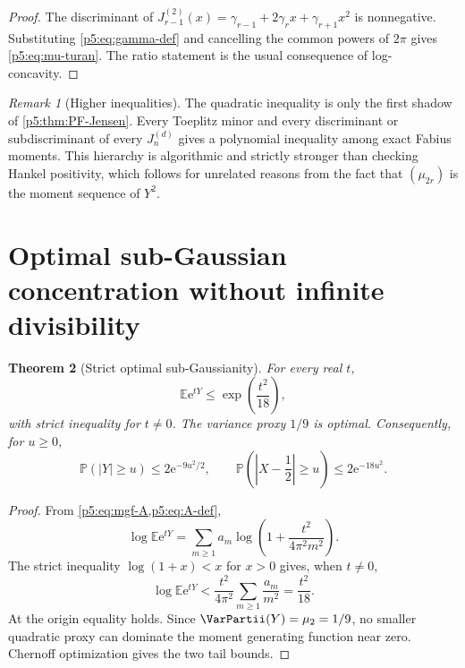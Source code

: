 \documentclass[11pt]{article}
\numberwithin{equation}{section}
\newtheorem{theorem}{Theorem}[section]
\theoremstyle{definition}
\theoremstyle{remark}
\newtheorem{remark}[theorem]{Remark}
\newcommand{\E}{\mathbb E}
\newcommand{\Prob}{\mathbb P}
\newcommand{\e}{\mathrm e}
\begin{document}
\begin{proof}
The discriminant of
$J_{r-1}^{(2)}(x)=\gamma_{r-1}+2\gamma_rx+\gamma_{r+1}x^2$
is nonnegative.  Substituting \cref{p5:eq:gamma-def} and cancelling the common
powers of $2\pi$ gives \cref{p5:eq:mu-turan}.  The ratio statement is the usual
consequence of log-concavity.
\end{proof}

\begin{remark}[Higher inequalities]
The quadratic inequality is only the first shadow of
\cref{p5:thm:PF-Jensen}.  Every Toeplitz minor and every discriminant or subdiscriminant
of every $J_n^{(d)}$ gives a polynomial inequality among exact Fabius moments.
This hierarchy is algorithmic and strictly stronger than checking Hankel
positivity, which follows for unrelated reasons from the fact that
$(\mu_{2r})$ is the moment sequence of $Y^2$.
\end{remark}

\section{Optimal sub-Gaussian concentration without infinite divisibility}

\begin{theorem}[Strict optimal sub-Gaussianity]\label{p5:thm:subgaussian}
For every real $t$,
\begin{equation}\label{p5:eq:subgaussian}
 \E\e^{tY}\le\exp\!\left(\frac{t^2}{18}\right),
\end{equation}
with strict inequality for $t\ne0$.  The variance proxy $1/9$ is optimal.
Consequently, for $u\ge0$,
\begin{equation}\label{p5:eq:tails-YX}
 \Prob(|Y|\ge u)\le2\e^{-9u^2/2},\qquad
 \Prob\!\left(\left|X-\frac12\right|\ge u\right)
 \le2\e^{-18u^2}.
\end{equation}
\end{theorem}

\begin{proof}
From \cref{p5:eq:mgf-A,p5:eq:A-def},
\[
 \log\E\e^{tY}
 =\sum_{m\ge1}a_m
 \log\!\left(1+\frac{t^2}{4\pi^2m^2}\right).
\]
The strict inequality $\log(1+x)<x$ for $x>0$ gives, when $t\ne0$,
\[
 \log\E\e^{tY}<\frac{t^2}{4\pi^2}
 \sum_{m\ge1}\frac{a_m}{m^2}
 =\frac{t^2}{18}.
\]
At the origin equality holds.  Since $\VarPartii(Y)=\mu_2=1/9$, no smaller
quadratic proxy can dominate the moment generating function near zero.
Chernoff optimization gives the two tail bounds.
\end{proof}
\end{document}
